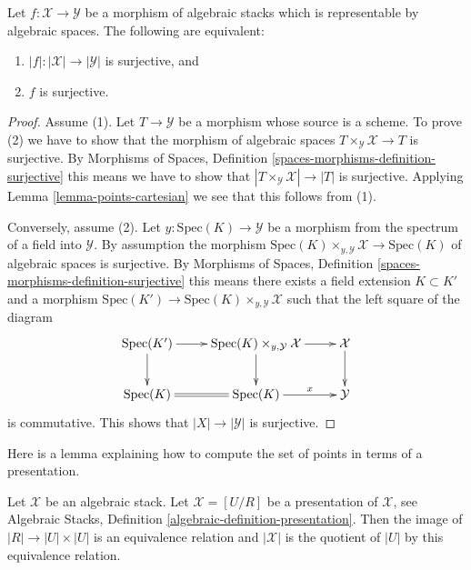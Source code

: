 \begin{lemma}
\label{lemma-characterize-surjective}
Let $f : \mathcal{X} \to \mathcal{Y}$ be a morphism of algebraic stacks
which is representable by algebraic spaces. The following are equivalent:
\begin{enumerate}
\item $|f| : |\mathcal{X}| \to |\mathcal{Y}|$ is surjective, and
\item $f$ is surjective.
\end{enumerate}
\end{lemma}

\begin{proof}
Assume (1). Let $T \to \mathcal{Y}$ be a morphism whose source is a scheme.
To prove (2) we have to show that the morphism of algebraic spaces
$T \times_{\mathcal{Y}} \mathcal{X} \to T$ is surjective. By
Morphisms of Spaces, Definition \ref{spaces-morphisms-definition-surjective}
this means we have to show that
$|T \times_{\mathcal{Y}} \mathcal{X}| \to |T|$ is surjective.
Applying
Lemma \ref{lemma-points-cartesian}
we see that this follows from (1).

\medskip\noindent
Conversely, assume (2). Let $y : \text{Spec}(K) \to \mathcal{Y}$ be a
morphism from the spectrum of a field into $\mathcal{Y}$. By assumption the
morphism
$\text{Spec}(K) \times_{y, \mathcal{Y}} \mathcal{X} \to \text{Spec}(K)$
of algebraic spaces is surjective. By
Morphisms of Spaces, Definition \ref{spaces-morphisms-definition-surjective}
this means there exists a field extension
$K \subset K'$ and a morphism
$\text{Spec}(K') \to \text{Spec}(K) \times_{y, \mathcal{Y}} \mathcal{X}$
such that the left square of the diagram
$$
\xymatrix{
\text{Spec}(K') \ar[r] \ar[d] &
\text{Spec}(K) \times_{y, \mathcal{Y}} \mathcal{X} \ar[d] \ar[r] &
\mathcal{X} \ar[d]
\\
\text{Spec}(K) \ar@{=}[r] &
\text{Spec}(K) \ar[r]^-x &
\mathcal{Y}
}
$$
is commutative. This shows that $|X| \to |\mathcal{Y}|$ is surjective.
\end{proof}

\noindent
Here is a lemma explaining how to compute the set of points in terms
of a presentation.

\begin{lemma}
\label{lemma-points-presentation}
Let $\mathcal{X}$ be an algebraic stack.
Let $\mathcal{X} = [U/R]$ be a presentation of $\mathcal{X}$, see
Algebraic Stacks, Definition \ref{algebraic-definition-presentation}.
Then the image of $|R| \to |U| \times |U|$ is an equivalence relation
and $|\mathcal{X}|$ is the quotient of $|U|$ by this equivalence relation.
\end{lemma}

